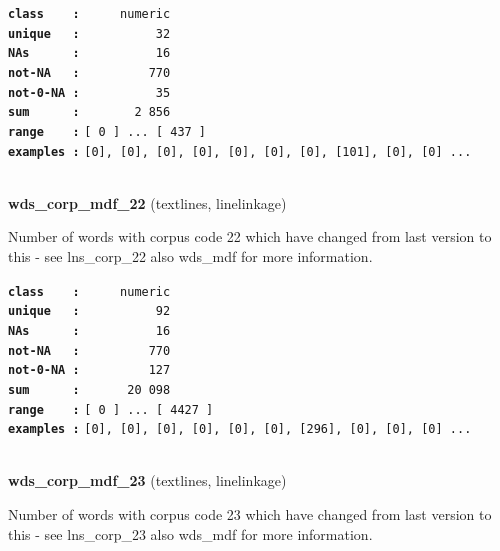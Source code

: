 \documentclass[]{article}
\begin{document}
\textbf{\texttt{class\ \ \ \ :}} \texttt{~~~~~numeric}\\
\textbf{\texttt{unique\ \ \ :}} \texttt{~~~~~~~~~~32}\\
\textbf{\texttt{NAs\ \ \ \ \ \ :}} \texttt{~~~~~~~~~~16}\\
\textbf{\texttt{not-NA\ \ \ :}} \texttt{~~~~~~~~~770}\\
\textbf{\texttt{not-0-NA\ :}} \texttt{~~~~~~~~~~35}\\
\textbf{\texttt{sum\ \ \ \ \ \ :}} \texttt{~~~~~~~2~856}\\
\textbf{\texttt{range\ \ \ \ :}}
\texttt{{[}\ 0\ {]}\ ...\ {[}\ 437\ {]}}\\
\textbf{\texttt{examples\ :}}
\texttt{{[}0{]},\ {[}0{]},\ {[}0{]},\ {[}0{]},\ {[}0{]},\ {[}0{]},\ {[}0{]},\ {[}101{]},\ {[}0{]},\ {[}0{]}\ ...}\\

~

\textbf{wds\_corp\_mdf\_22} (textlines, linelinkage)

Number of words with corpus code 22 which have changed from last version
to this - see lns\_corp\_22 also wds\_mdf for more information.

\textbf{\texttt{class\ \ \ \ :}} \texttt{~~~~~numeric}\\
\textbf{\texttt{unique\ \ \ :}} \texttt{~~~~~~~~~~92}\\
\textbf{\texttt{NAs\ \ \ \ \ \ :}} \texttt{~~~~~~~~~~16}\\
\textbf{\texttt{not-NA\ \ \ :}} \texttt{~~~~~~~~~770}\\
\textbf{\texttt{not-0-NA\ :}} \texttt{~~~~~~~~~127}\\
\textbf{\texttt{sum\ \ \ \ \ \ :}} \texttt{~~~~~~20~098}\\
\textbf{\texttt{range\ \ \ \ :}}
\texttt{{[}\ 0\ {]}\ ...\ {[}\ 4427\ {]}}\\
\textbf{\texttt{examples\ :}}
\texttt{{[}0{]},\ {[}0{]},\ {[}0{]},\ {[}0{]},\ {[}0{]},\ {[}0{]},\ {[}296{]},\ {[}0{]},\ {[}0{]},\ {[}0{]}\ ...}\\

~

\textbf{wds\_corp\_mdf\_23} (textlines, linelinkage)

Number of words with corpus code 23 which have changed from last version
to this - see lns\_corp\_23 also wds\_mdf for more information.
\end{document}
